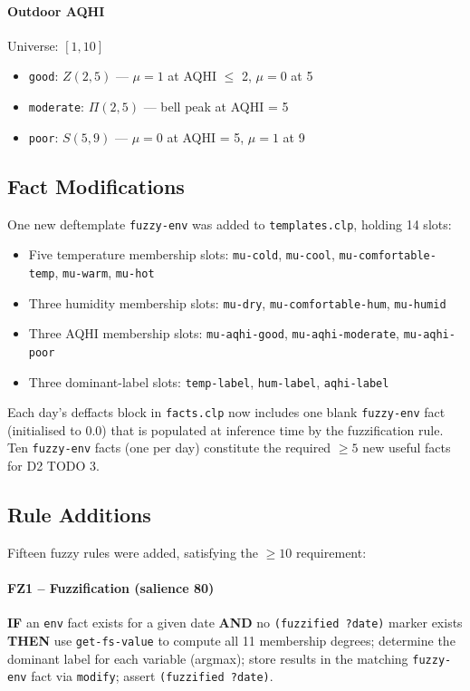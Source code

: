 \documentclass{article}
\begin{document}
\paragraph{Outdoor AQHI} Universe: $[1, 10]$
\begin{itemize}
    \item \texttt{good}: $Z(2, 5)$ — $\mu=1$ at AQHI $\leq$ 2, $\mu=0$ at 5
    \item \texttt{moderate}: $\Pi(2, 5)$ — bell peak at AQHI = 5
    \item \texttt{poor}: $S(5, 9)$ — $\mu=0$ at AQHI = 5, $\mu=1$ at 9
\end{itemize}

\subsection{Fact Modifications}

One new deftemplate \texttt{fuzzy-env} was added to \texttt{templates.clp}, holding 14 slots:

\begin{itemize}
    \item Five temperature membership slots: \texttt{mu-cold}, \texttt{mu-cool}, \texttt{mu-comfortable-temp}, \texttt{mu-warm}, \texttt{mu-hot}
    \item Three humidity membership slots: \texttt{mu-dry}, \texttt{mu-comfortable-hum}, \texttt{mu-humid}
    \item Three AQHI membership slots: \texttt{mu-aqhi-good}, \texttt{mu-aqhi-moderate}, \texttt{mu-aqhi-poor}
    \item Three dominant-label slots: \texttt{temp-label}, \texttt{hum-label}, \texttt{aqhi-label}
\end{itemize}

Each day's deffacts block in \texttt{facts.clp} now includes one blank \texttt{fuzzy-env} fact (initialised to 0.0) that is populated at inference time by the fuzzification rule. Ten \texttt{fuzzy-env} facts (one per day) constitute the required $\geq 5$ new useful facts for D2 TODO 3.

\subsection{Rule Additions}

Fifteen fuzzy rules were added, satisfying the $\geq 10$ requirement:

\paragraph{FZ1 -- Fuzzification (salience 80)}
\textbf{IF} an \texttt{env} fact exists for a given date \textbf{AND} no \texttt{(fuzzified ?date)} marker exists \\
\textbf{THEN} use \texttt{get-fs-value} to compute all 11 membership degrees; determine the dominant label for each variable (argmax); store results in the matching \texttt{fuzzy-env} fact via \texttt{modify}; assert \texttt{(fuzzified ?date)}.
\end{document}

